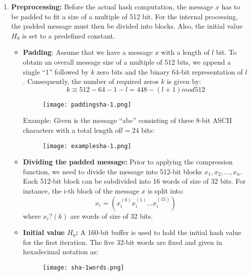 \documentclass{article}
\begin{document}
\begin{enumerate}
    \item \textbf{Preprocessing:} Before the actual hash computation, the message $x$ has to be padded to fit a size of a multiple of 512 bit. For the internal processing, the padded message must then be divided into blocks. Also, the initial value $H_0$ is set to a predefined constant.
    \begin{itemize}
        \item \textbf{Padding}: Assume that we have a message $x$ with a length of $l$ bit. To obtain an overall message size of a multiple of 512 bits, we append a single “1” followed by $k$ zero bits and the binary 64-bit representation of $l$. Consequently, the number of required zeros $k$ is given by:
        \begin{equation*}
            k \equiv 512-64-1-l = 448-(l+1) mod512
        \end{equation*}
        \begin{figure} [H]
            \centering
            \texttt{[image: paddingsha-1.png]}
        \end{figure}
        Example: Given is the message “abc” consisting of three 8-bit ASCII characters with a total length of$l=24$ bits:
        \begin{figure} [H]
            \centering
            \texttt{[image: examplesha-1.png]}
        \end{figure}
        \item \textbf{Dividing the padded message:} Prior  to  applying  the  compression  function,  we need to divide the message into 512-bit blocks $x_1,x_2, ... ,x_n$. Each 512-bit block can be subdivided into 16 words of size of 32 bits. For instance, the i-th block of the message $x$ is split into:
        \begin{equation*}
            x_i = (x_i^{(0)}x_i^{(1)}...x_i^{(15)})
        \end{equation*}
        where $x_i?{(k)}$ are words of size of 32 bits.
        \item \textbf{Initial value $H_0$:} A 160-bit buffer is used to hold the initial hash value for the first iteration. The five 32-bit words are fixed and given in hexadecimal notation as:
        \begin{figure}  [H]
            \centering
            \texttt{[image: sha-1words.png]}
        \end{figure}
    \end{itemize}

\end{enumerate}
\end{document}
